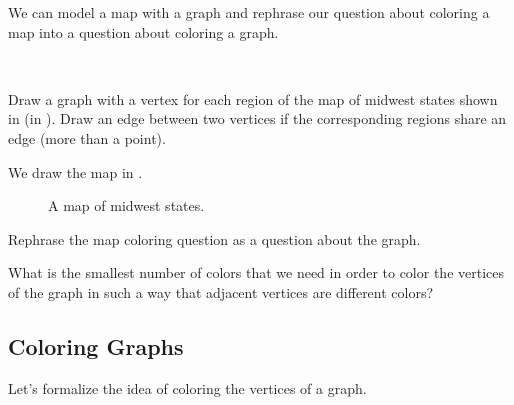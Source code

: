We can model a map with a graph and rephrase our question about coloring a map into a question about coloring a graph.

\begin{exam}
\label{exam_map_coloring}
~
    \begin{apart}
        \item Draw a graph with a vertex for each region of the map of midwest states shown in  (in  ).  Draw an edge between two vertices if the corresponding regions share an edge (more than a point).

            \begin{soln}
                We draw the map in .             
            \end{soln}

            \begin{figure}[hbtp]
                \centering
                
                \caption{A map of midwest states.}
                \label{fig_graph_midwest}
            \end{figure}
        \item Rephrase the map coloring question as a question about the graph.
            \begin{soln}
                What is the smallest number of colors that we need in order to color the vertices of the graph in such a way that adjacent vertices are different colors?
            \end{soln}
    \end{apart}
\end{exam}

\newcommand{\subchromatic}{Coloring Graphs}
\subsection{\subchromatic}
\label{sub_chromatic_number}

Let's formalize the idea of coloring the vertices of a graph.


